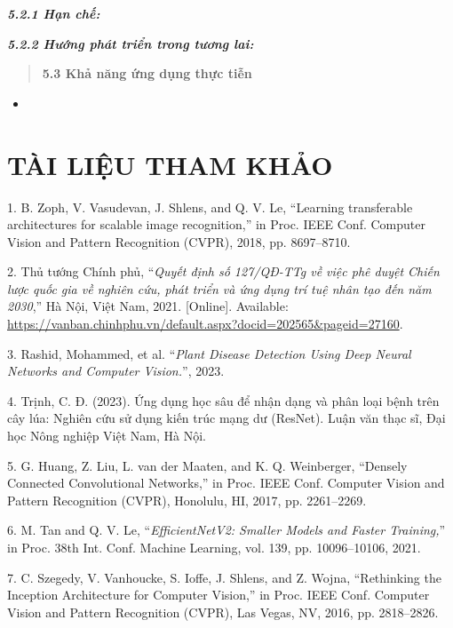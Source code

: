 \documentclass[
]{article}
\providecommand{\tightlist}{%
  \setlength{\itemsep}{0pt}\setlength{\parskip}{0pt}}
\begin{document}
\protect{}\label{_Toc232112043}{}\emph{\textbf{5.2.1 Hạn
chế:}}

\protect{}\label{_Toc232112044}{}\emph{\textbf{5.2.2 Hướng
phát triển trong tương lai:}}

\begin{quote}
\protect{}\label{_Toc232112045}{}\textbf{5.3 Khả năng ứng
dụng thực tiễn}
\end{quote}

\begin{itemize}
\tightlist
\item
\end{itemize}

\section{TÀI LIỆU THAM KHẢO}\label{tuxe0i-liux1ec7u-tham-khux1ea3o}

1. B. Zoph, V. Vasudevan, J. Shlens, and Q. V. Le, ``Learning
transferable architectures for scalable image recognition,'' in Proc.
IEEE Conf. Computer Vision and Pattern Recognition (CVPR), 2018, pp.
8697--8710.

2. Thủ tướng Chính phủ, ``\emph{Quyết định số 127/QĐ-TTg về việc phê
duyệt Chiến lược quốc gia về nghiên cứu, phát triển và ứng dụng trí tuệ
nhân tạo đến năm 2030},'' Hà Nội, Việt Nam, 2021. {[}Online{]}.
Available: \url{https://vanban.chinhphu.vn/default.aspx?docid=202565&pageid=27160}.

3. Rashid, Mohammed, et al. ``\emph{Plant Disease Detection Using Deep
Neural Networks and Computer Vision.}'', 2023.

4. Trịnh, C. Đ. (2023). Ứng dụng học sâu để nhận dạng và phân loại bệnh
trên cây lúa: Nghiên cứu sử dụng kiến trúc mạng dư (ResNet). Luận văn
thạc sĩ, Đại học Nông nghiệp Việt Nam, Hà Nội.

5. G. Huang, Z. Liu, L. van der Maaten, and K. Q. Weinberger, ``Densely
Connected Convolutional Networks,'' in Proc. IEEE Conf. Computer Vision
and Pattern Recognition (CVPR), Honolulu, HI, 2017, pp. 2261--2269.

6. M. Tan and Q. V. Le, ``\emph{EfficientNetV2: Smaller Models and
Faster Training,}'' in Proc. 38th Int. Conf. Machine Learning, vol. 139,
pp. 10096--10106, 2021.

7. C. Szegedy, V. Vanhoucke, S. Ioffe, J. Shlens, and Z. Wojna,
``Rethinking the Inception Architecture for Computer Vision,'' in Proc.
IEEE Conf. Computer Vision and Pattern Recognition (CVPR), Las Vegas,
NV, 2016, pp. 2818--2826.
\end{document}
